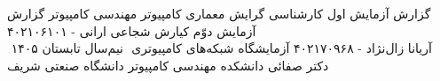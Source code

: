 ‫
‫%
‫%
‫%
‫
‫\newcommand{\ProjectReportType}
‫{گزارش آزمایش اول} 
‫\newcommand{\StudentDegree}
‫{کارشناسی گرایش معماری کامپیوتر}  %
‫\newcommand{\CourseMajor}
‫{مهندسی کامپیوتر}  %
‫\newcommand{\CourseReportTitle}
‫{گزارش آزمایش  دوّم}
‫\newcommand{\GroupeMembers}
‫{کیارش شجاعی ارانی - ۴۰۲۱۰۶۱۰۱ \\ آریانا زال‌نژاد - ۴۰۲۱۷۰۹۶۸}
‫\newcommand{\CourseName}
‫{آزمایشگاه شبکه‌های کامپیوتری}
‫
‫\newcommand{\courseSemester}
‫{نیم‌سال تابستان ۱۴۰۵}
‫
‫\newcommand{\CourseProfessor}
‫{دکتر صفائی}
‫\newcommand{\Department}
‫{دانشکده مهندسی کامپیوتر}
‫\newcommand{\University}
‫{دانشگاه صنعتی شریف}
‫
‫%
‫%
‫%
‫
‫